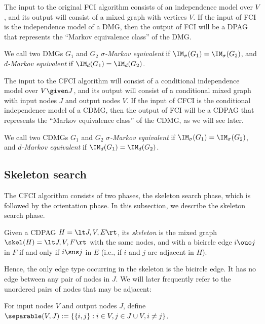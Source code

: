 The input to the original FCI algorithm consists of an independence model over $V$,
and its output will consist of a mixed graph with vertices $V$.
If the input of FCI is the independence model of a DMG, then the output of FCI
will be a DPAG that represents the ``Markov equivalence class'' of the DMG.
\begin{Def}\label{def:Markov_equivalent}
  We call two DMGs $G_1$ and $G_2$ \emph{$\sigma$-Markov equivalent} if $\IM_\sigma(G_1) = \IM_\sigma(G_2)$,
  and \emph{$d$-Markov equivalent} if $\IM_d(G_1) = \IM_d(G_2)$.
\end{Def}
The input to the CFCI algorithm will consist of a conditional independence model over $V \given J$,
and its output will consist of a conditional mixed graph with input nodes $J$ and output nodes $V$.
If the input of CFCI is the conditional independence model of a CDMG, then the output of FCI
will be a CDPAG that represents the ``Markov equivalence class'' of the CDMG, as
we will see later.
\begin{Def}\label{def:Markov_equivalent}
  We call two CDMGs $G_1$ and $G_2$ \emph{$\sigma$-Markov equivalent} if $\IM_\sigma(G_1) = \IM_\sigma(G_2)$,
  and \emph{$d$-Markov equivalent} if $\IM_d(G_1) = \IM_d(G_2)$.
\end{Def}

\subsection{Skeleton search}

The CFCI algorithm consists of two phases, the skeleton search phase, which is followed by the orientation phase.
In this subsection, we describe the skeleton search phase.

\begin{Def}\label{def:skeleton}
Given a CDPAG $H = \lt J, V, E \rt$, its \emph{skeleton} is the mixed graph 
$\skel(H) = \lt J, V, F \rt$ with the same nodes, and with a bicircle edge $i \ouo j$ in $F$
if and only if $i \sus j$ in $E$ (i.e., if $i$ and $j$ are adjacent in $H$).
\end{Def}
Hence, the only edge type occurring in the skeleton is the bicircle edge.
It has no edge between any pair of nodes in $J$.
We will later frequently refer to the unordered pairs of nodes that may be adjacent:
\begin{Def}
  For input nodes $V$ and output nodes $J$, define $\separable(V,J) := \{ \{i,j\} : i \in V, j \in J \cup V, i \ne j \}$.
\end{Def}

